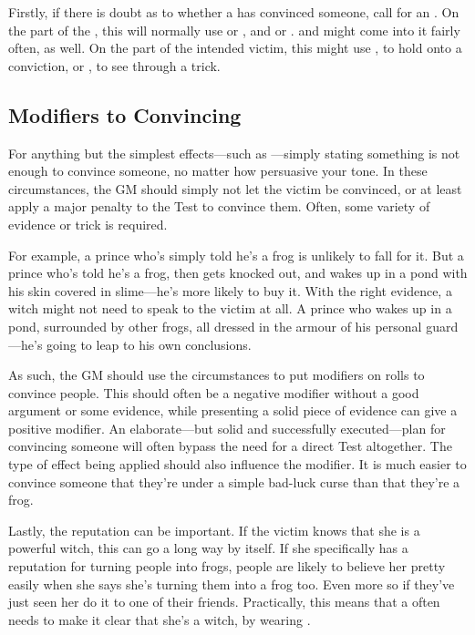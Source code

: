 Firstly, if there is doubt as to whether a  has convinced someone, call for an {\opposedtest}.
On the part of the , this will normally use  or , and  or .
 and  might come into it fairly often, as well.
On the part of the intended victim, this might use , to hold onto a conviction, or , to see through a trick.

\subsection{Modifiers to Convincing}

For anything but the simplest effects---such as ---simply stating something is not enough to convince someone, no matter how persuasive your tone.
In these circumstances, the GM should simply not let the victim be convinced, or at least apply a major penalty to the Test to convince them.
Often, some variety of evidence or trick is required.

For example, a prince who's simply told he's a frog is unlikely to fall for it.
But a prince who's told he's a frog, then gets knocked out, and wakes up in a pond with his skin covered in slime---he's more likely to buy it.
With the right evidence, a witch might not need to speak to the victim at all.
A prince who wakes up in a pond, surrounded by other frogs, all dressed in the armour of his personal guard---he's going to leap to his own conclusions.

As such, the GM should use the circumstances to put modifiers on rolls to convince people.
This should often be a negative modifier without a good argument or some evidence, while presenting a solid piece of evidence can give a positive modifier.
An elaborate---but solid and successfully executed---plan for convincing someone will often bypass the need for a direct Test altogether.
The type of effect being applied should also influence the modifier.
It is much easier to convince someone that they're under a simple bad-luck curse than that they're a frog.

Lastly, the  reputation can be important.
If the victim knows that she is a powerful witch, this can go a long way by itself.
If she specifically has a reputation for turning people into frogs, people are likely to believe her pretty easily when she says she's turning them into a frog too.
Even more so if they've just seen her do it to one of their friends.
Practically, this means that a  often needs to make it clear that she's a witch, by wearing {\thehat}.

